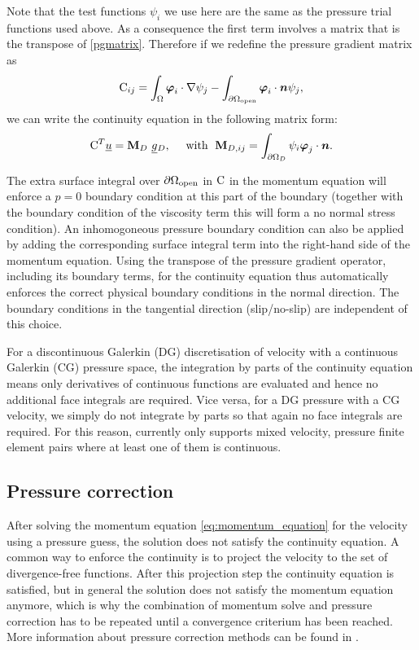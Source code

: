 Note that the test functions $\psi_i$ we use here are the
same as the pressure trial functions used above. As a consequence
the first term involves a matrix that is the
transpose of \eqref{pgmatrix}. Therefore if we redefine the pressure
gradient matrix as
\begin{equation*}
  \mathrm{C}_{ij}=\int_\Omega {\mbox{\boldmath$\varphi$}}_i\cdot\nabla\psi_j
    -\int_{{\partial\Omega}_{\mathrm{open}}} {\mbox{\boldmath$\varphi$}}_i\cdot{\mbox{\boldmath$n$}}\psi_j ,
\end{equation*}
we can write the continuity equation in the following matrix form:
\begin{equation}
  \mathrm{C}^T \underline{u}=
    {\mbox{\boldmath$\mathrm{M}$}}_D ~\underline{g}{}_D,
    \quad\text{ with }\;
    {\mbox{\boldmath$\mathrm{M}$}}_{D,ij}=\int_{{\partial\Omega}_D} \psi_i{\mbox{\boldmath$\varphi$}}_j\cdot{\mbox{\boldmath$n$}}.
  \label{discrete_incompressible_continuity}
\end{equation}

The extra surface integral over ${\partial\Omega}_{\mathrm{open}}$ in
$\mathrm{C}$ in the momentum equation will enforce
a $p=0$ boundary condition at this part of the boundary (together with the
boundary condition of the viscosity term this will form a no normal stress
condition). An inhomogoneous pressure boundary condition can also
be applied by adding the corresponding
surface integral term into the right-hand side of the momentum equation.
Using the transpose of the pressure gradient operator, including its
boundary terms, for the continuity equation thus automatically
enforces the correct physical boundary conditions in the normal
direction.
The boundary
conditions in the tangential direction (slip/no-slip) are independent of this choice.

For a discontinuous Galerkin (DG) discretisation of velocity with a continuous
Galerkin (CG) pressure space, the integration by parts of the continuity
equation means only derivatives of continuous functions are evaluated and hence
no additional face integrals are required. Vice versa, for a DG pressure with a CG
velocity, we simply do not integrate by parts so that again no face integrals
are required. For this reason, \fluidity currently only supports mixed velocity,
pressure finite element pairs where at least one of them is continuous.

\subsection{Pressure correction}\label{Sect:pressure_correction}

After solving the momentum equation \eqref{eq:momentum_equation} for the
velocity using a pressure guess, the solution does not satisfy the
continuity equation. A common way to enforce the continuity is to project
the velocity to the set of divergence-free functions. After this projection
step the continuity equation is satisfied, but in general the solution does
not satisfy the momentum equation anymore, which is why the combination of
momentum solve and pressure correction has to be repeated until a
convergence criterium has been reached.
More information about pressure correction methods can be
found in \cite{gresho1988}.

